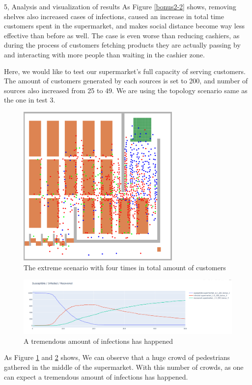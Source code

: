 \documentclass[10pt,a4paper]{article}
\begin{document}
\begin{task}{5, Analysis and visualization of results}
As Figure \ref{bonus2-2} shows, removing shelves also increased cases of infections, caused an increase in total time customers spent in the supermarket, and makes social distance become way less effective than before as well. The case is even worse than reducing cashiers, as during the process of customers fetching products they are actually passing by and interacting with more people than waiting in the cashier zone.


\bigskip


Here, we would like to test our supermarket's full capacity of serving customers. The amount of customers generated by each sources is set to 200, and number of sources also increased from 25 to 49. We are using the topology scenario same as the one in test 3.


\begin{figure}[H]
    \includegraphics[width=8cm]{images/bonus3.png}
    \centering
    \caption{The extreme scenario with four times in total amount of customers}
    \label{bonus3}
\end{figure}

\begin{figure}[H]
    \includegraphics[width=12cm]{images/bonus3-2.png}
    \centering
    \caption{A tremendous amount of infections has happened}
    \label{bonus3-2}
\end{figure}

As Figure \ref{bonus3} and \ref{bonus3-2} shows, We can observe that a huge crowd of pedestrians gathered in the middle of the supermarket. With this number of crowds, as one can expect a tremendous amount of infections has happened.



\end{task}



\end{document}
